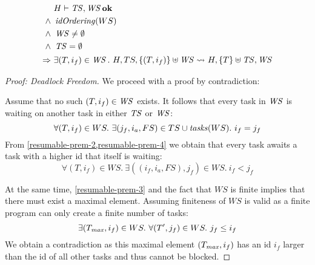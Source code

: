 \begin{lemma} \label{resumable-task}
\begin{alignat}{2}
&H \vdash \TS, \WS \bn{ok} \label{resumable-prem-1}\\
\wedge\ &\vn{idOrdering}(WS) \label{resumable-prem-2}\\
\wedge\ &\WS \neq \emptyset \label{resumable-prem-3}\\
\wedge\ &\TS = \emptyset \label{resumable-prem-4}\\
\Rightarrow\ &\exists (T, i_f) \in \WS.\ \reductasks{}[TS, \{(T,i_f)\} \uplus \WS]{T}* \label{resumable-concl}
\end{alignat}
\end{lemma}
\begin{proof}[Proof: Deadlock Freedom]
We proceed with a proof by contradiction:

Assume that no such $(T,i_f) \in \mathop{\mathit{WS}}$ exists. It follows that every task in $\mathop{\mathit{WS}}$ is waiting on another task in either $\mathop{\mathit{TS}}$ or $\mathop{\mathit{WS}}$:
\begin{equation}
    \forall (T,i_f) \in WS.\ \exists (j_f, i_a, FS) \in TS \cup \mathop{\mathit{tasks}}(WS).\ i_f = j_f
\end{equation}
From \cref{resumable-prem-2,resumable-prem-4} we obtain that every task awaits a task with a higher id that itself is waiting:
\begin{equation}
    \forall (T,i_f) \in WS.\ \exists ((i_f,i_a,FS),j_f) \in WS.\ i_f < j_f
\end{equation}

At the same time, \cref{resumable-prem-3} and the fact that $WS$ is finite implies that there must exist a maximal element. Assuming finiteness of $WS$ is valid as a finite program can only create a finite number of tasks:
\begin{equation}
    \exists (T_{\mathop{\mathit{max}}},i_f) \in WS.\ \forall (T',j_f) \in WS.\ j_f \leq i_f
\end{equation}
We obtain a contradiction as this maximal element $(T_{\mathop{\mathit{max}}}, i_f)$ has an id $i_f$ larger than the id of all other tasks and thus cannot be blocked.
\end{proof}

